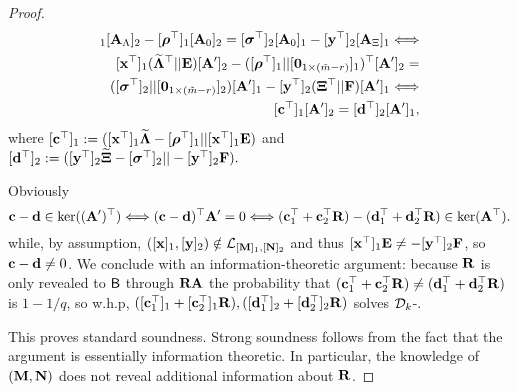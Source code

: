 \begin{proof}
\begin{align*}
[\vecb{x}^\top]_1 [\matr{A}_\Lambda]_2  - [\grkb{\rho}^\top]_1[\matr{A}_0]_2=  [\grkb{\sigma}^\top]_2 [\matr{A}_0]_1-[\vecb{y}^\top]_2 [\matr{A}_\Xi]_1   \Longleftrightarrow\\
[\vecb{x}^\top]_1 (\widetilde{\matr{\Lambda}}^{\top}|| \matr{E})[\matr{A}']_2  - ([\grkb{\rho}^{\top}]_1||[\matr{0}_{1\times(\tm-r)}]_1)^\top[\matr{A}']_2 = \\
( [\grkb{\sigma}^\top]_2 || [\matr{0}_{1\times(\tm-r)}]_2)  [\matr{A}']_1-[\vecb{y}^\top]_2 (\matr{\Xi}^{\top}|| \matr{F} ) [\matrA']_1  \Longleftrightarrow\\
[\vecb{c}^{\top}]_1 [\matrA']_2=[\vecb{d}^{\top}]_2 [\matrA']_1,
\end{align*}
 where $[\mathbf{c}^{\top}]_1:=([\mathbf{x}^{\top}]_1\widetilde{\mathbf{{\Lambda}}}-[{\boldsymbol \rho}^{\top}]_1|| [\mathbf{x}^{\top}]_1 \mathbf{{E}})$ and $ [\mathbf{d}^{\top}]_2:=([\mathbf{y}^{\top}]_2\widetilde{\mathbf{{\Xi}}}-[{\boldsymbol \sigma}^{\top}]_2|| -[\mathbf{y}^{\top}]_2 \mathbf{{F}}).$

Obviously 
$$\mathbf{c}-\mathbf{d} \in \ker((\mathbf{{A}}')^{\top}) 
\Longleftrightarrow (\mathbf{c}-\mathbf{d})^{\top} \mathbf{{A}}'=0 \Longleftrightarrow (\mathbf{c}_1^{\top}+\mathbf{c}_2^{\top} \mathbf{{R}})-(\mathbf{d}_1^{\top}+\mathbf{d}_2^{\top} \mathbf{{R}})
 \in \ker(\mathbf{{A}}^{\top}).$$
while, by assumption,  $([\mathbf{x}]_1,[\mathbf{y}]_2) \notin \mathcal{L}_{[\mathbf{{M}}]_1,[\mathbf{{N}}]_2}$ and thus
$[\mathbf{x}^{\top}]_1 \mathbf{{E}} \neq -[\mathbf{y}^{\top}]_2 \mathbf{{F}}$, so $\mathbf{c}-\mathbf{d} \neq 0$.
 We conclude with an information-theoretic argument: because $\mathbf{{R}}$ is only revealed to $\mathsf{B}$ through $\mathbf{{R}}\mathbf{{A}}$
the probability that  
$(\mathbf{c}_1^{\top}+\mathbf{c}_2^{\top} \mathbf{{R}})\neq (\mathbf{d}_1^{\top}+\mathbf{d}_2^{\top} \mathbf{{R}})$ is $1-1/q$, so w.h.p, $([\mathbf{c}_1^{\top}]_1+[\mathbf{c}_2^{\top}]_1 \mathbf{{R}}),([\mathbf{d}_1^{\top}]_2+[\mathbf{d}_2^{\top}]_2 \mathbf{{R}})$ 
solves $\mathcal{D}_{k}$-\skermdh{}.

This proves standard soundness. Strong soundness follows from the fact that the argument is essentially information theoretic. In particular, the knowledge of $(\mathbf{{M}},\mathbf{{N}})$ does not reveal additional information about $\mathbf{{R}}$. 
\end{proof}
